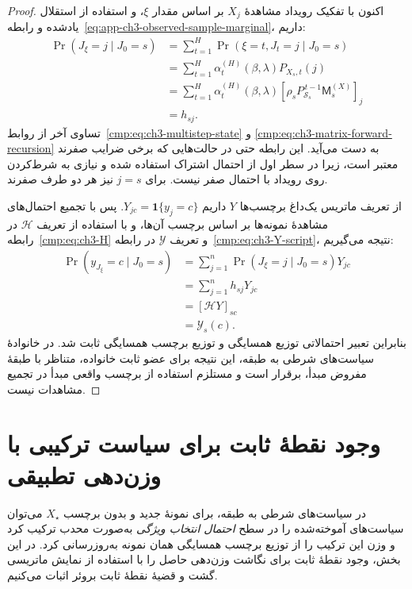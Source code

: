 \begin{proof}
اکنون با تفکیک رویداد مشاهدهٔ $X_j$ بر اساس مقدار $\xi$،
و استفاده از استقلال یادشده و رابطه~\eqref{eq:app-ch3-observed-sample-marginal}،
داریم:
\begin{equation}\label{eq:app-ch3-observation-neighborhood}
\begin{aligned}
\Pr(J_\xi=j\mid J_0=s)
&=\sum_{t=1}^{H}\Pr(\xi=t,J_t=j\mid J_0=s)\\
&=\sum_{t=1}^{H}\alpha_t^{(H)}(\beta,\lambda)
P_{X_s,t}(j)\\
&=\sum_{t=1}^{H}\alpha_t^{(H)}(\beta,\lambda)
[\rho_sP_{\mathcal S_s}^{\,t-1}\mathsf M_s^{(X)}]_j\\
&=h_{sj}.
\end{aligned}
\end{equation}
تساوی آخر از روابط~\eqref{cmp:eq:ch3-multistep-state} و
\eqref{cmp:eq:ch3-matrix-forward-recursion} به دست می‌آید.
این رابطه حتی در حالت‌هایی که برخی ضرایب صفرند معتبر است،
زیرا در سطر اول از احتمال اشتراک استفاده شده و نیازی به
شرط‌کردن روی رویداد با احتمال صفر نیست.
برای $j=s$ نیز هر دو طرف صفرند.

از تعریف ماتریس یک‌داغ برچسب‌ها $Y$ داریم
$Y_{jc}=\mathbf1\{y_j=c\}$.
پس با تجمیع احتمال‌های مشاهدهٔ نمونه‌ها بر اساس برچسب آن‌ها،
و با استفاده از تعریف $\mathscr H$ در
رابطه~\eqref{cmp:eq:ch3-H} و تعریف $\mathscr Y$ در
رابطه~\eqref{cmp:eq:ch3-Y-script}، نتیجه می‌گیریم:
\begin{equation}\label{eq:app-ch3-observation-label-neighborhood}
\begin{aligned}
\Pr(y_{J_\xi}=c\mid J_0=s)
&=\sum_{j=1}^{n}\Pr(J_\xi=j\mid J_0=s)Y_{jc}\\
&=\sum_{j=1}^{n}h_{sj}Y_{jc}\\
&=[\mathscr H Y]_{sc}\\
&=\mathscr Y_s(c).
\end{aligned}
\end{equation}
بنابراین تعبیر احتمالاتی توزیع همسایگی و توزیع برچسب
همسایگی ثابت شد. در خانوادهٔ سیاست‌های شرطی به طبقه،
این نتیجه برای عضو ثابت خانواده، متناظر با طبقهٔ مفروض
مبدأ، برقرار است و مستلزم استفاده از برچسب واقعی مبدأ
در تجمیع مشاهدات نیست.
\end{proof}

\section{وجود نقطهٔ ثابت برای سیاست ترکیبی با وزن‌دهی تطبیقی}
\label{app:ch3-adaptive-policy-fixed-point}
در سیاست‌های شرطی به طبقه، برای نمونهٔ جدید و بدون برچسب $X_\star$
می‌توان سیاست‌های آموخته‌شده را در سطح \emph{احتمال انتخاب ویژگی}
به‌صورت محدب ترکیب کرد و وزن این ترکیب را از توزیع برچسب همسایگی
همان نمونه به‌روزرسانی کرد. در این بخش، وجود نقطهٔ ثابت برای نگاشت
وزن‌دهی حاصل را با استفاده از نمایش ماتریسی گشت و قضیهٔ نقطهٔ ثابت
بروئر اثبات می‌کنیم.

